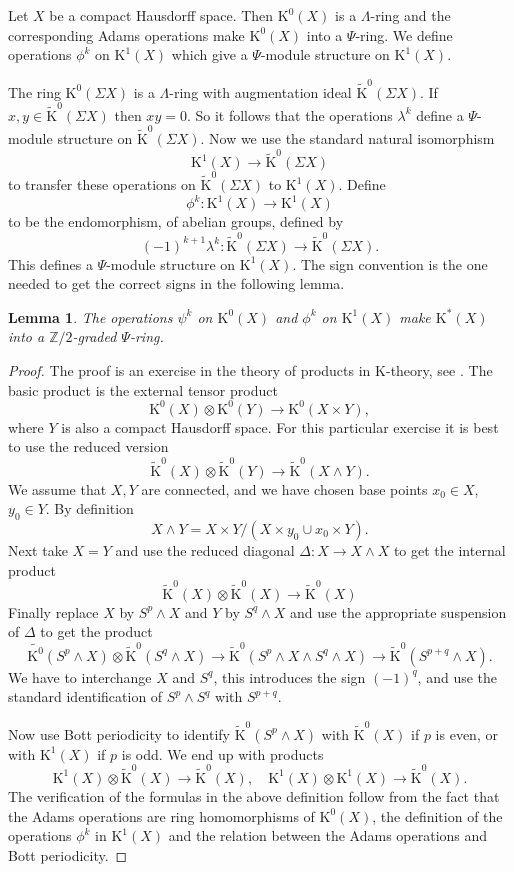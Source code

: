 \documentclass[twoside,a4paper,reqno,11pt]{amsart}
\newtheorem{lemma}{Lemma}[subsection]
\newcommand{\K}{\mathrm{K}}
\newcommand{\Z}{\mathbb{Z}}
\begin{document}
Let $X$ be a compact Hausdorff space. Then $\K^0(X)$ is a $\Lambda$-ring and the corresponding Adams operations make $\K^0(X)$ into a $\Psi$-ring. We define operations $\phi^k$ on $\K^1(X)$ which give a $\Psi$-module structure on $\K^1(X)$.

The ring $\K^0(\Sigma X)$ is a $\Lambda$-ring with augmentation ideal $\tilde{\K}^0(\Sigma X)$.  If $x,y \in \tilde{\K}^0(\Sigma X)$ then  $xy = 0$.  So it follows that the operations $\lambda^k$ define a $\Psi$-module structure on $\tilde{\K}^0(\Sigma X)$. Now we use the standard natural isomorphism
$$
\K^1(X) \to \tilde{\K}^0(\Sigma X)
$$
to transfer these operations on $\tilde{\K}^0(\Sigma X)$ to $\K^1(X)$. Define 
$$
\phi^k  : \K^1(X) \to \K^1(X)
$$
to be the endomorphism, of abelian groups, defined by 
$$
(-1)^{k+1}\lambda^k : \tilde{\K}^0(\Sigma X) \to \tilde{\K}^0(\Sigma X).
$$
This defines a $\Psi$-module structure on $\K^1(X)$. The sign convention is the one needed to get the correct signs in the following lemma. 

\begin{lemma} \label{lem:Z2gradedPsiRing}
The operations $\psi^k$ on $\K^0(X)$ and $\phi^k$ on $\K^1(X)$ make $\K^*(X)$ into a $\Z/2$-graded $\Psi$-ring.
\end{lemma}

\begin{proof}
The proof is an exercise in the theory of products in $\K$-theory, see \cite[Chapter~2, Section~2.6]{atiyah2018k}. The basic product is the external tensor product
$$
\K^{0}(X) \otimes \K^0(Y) \to \K^0(X \times Y),
$$
where $Y$ is also a compact Hausdorff space. For this particular exercise it is best to use the reduced version 
$$
\tilde{\K}^{0}(X) \otimes \tilde{\K}^0(Y) \to \tilde{\K}^0(X \wedge Y).
$$
We assume that $X, Y$ are connected, and we have chosen base points $x_0 \in X$, $y_0 \in Y$.  By definition
$$
X\wedge Y = X\times Y /(X\times y_0 \cup x_0 \times Y).
$$
Next take $X = Y$ and use the reduced diagonal $\Delta : X \to X \wedge X$ to get the internal product
$$
\tilde{\K}^{0}(X) \otimes \tilde{\K}^0(X) \to \tilde{\K}^0(X)
$$
Finally replace $X$ by $S^p\wedge X$ and $Y$ by $S^q\wedge X$ and use the appropriate suspension of $\Delta$ to get the product 
$$
\tilde{\K^0}(S^p \wedge X) \otimes \tilde{\K}^0(S^q\wedge X) \to \tilde{\K}^0(S^p \wedge X\wedge S^q \wedge X) \to \tilde{\K}^0(S^{p+q}\wedge X).
$$
We have to interchange $X$ and $S^q$, this introduces the sign $(-1)^q$, and use the standard identification of $S^p\wedge S^q$ with $S^{p+q}$.

Now use Bott periodicity to identify $\tilde{\K}^0(S^p \wedge X)$ with $\tilde{\K}^0( X)$ if $p$ is even, or with $\K^1(X)$ if $p$ is odd.   We end up with products  
$$
\K^1(X) \otimes\tilde{\K}^0(X)  \to \tilde{\K}^0(X), \quad \K^1(X) \otimes \K^1(X) \to \tilde{\K}^0(X).
$$
The verification of the formulas in the above definition follow from the fact that the Adams operations are ring homomorphisms of $\K^0(X)$, the definition of the operations $\phi^k$ in $\K^1(X)$ and the relation between the Adams operations and Bott periodicity.
\end{proof}
\end{document}
